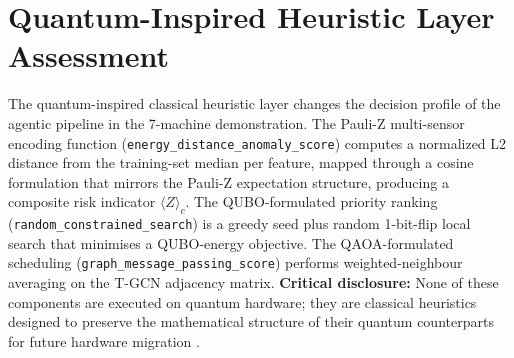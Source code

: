 \section{Quantum-Inspired Heuristic Layer Assessment}

The quantum-inspired classical heuristic layer changes the decision profile of the agentic pipeline in the 7-machine demonstration. The Pauli-Z multi-sensor encoding function (\texttt{energy\_distance\_anomaly\_score}) computes a normalized L2 distance from the training-set median per feature, mapped through a cosine formulation that mirrors the Pauli-Z expectation structure, producing a composite risk indicator $\langle Z \rangle_c$. The QUBO-formulated priority ranking (\texttt{random\_constrained\_search}) is a greedy seed plus random 1-bit-flip local search that minimises a QUBO-energy objective. The QAOA-formulated scheduling (\texttt{graph\_message\_passing\_score}) performs weighted-neighbour averaging on the T-GCN adjacency matrix. \textbf{Critical disclosure:} None of these components are executed on quantum hardware; they are classical heuristics designed to preserve the mathematical structure of their quantum counterparts for future hardware migration \cite{Blekos2024, Preskill2018}.

